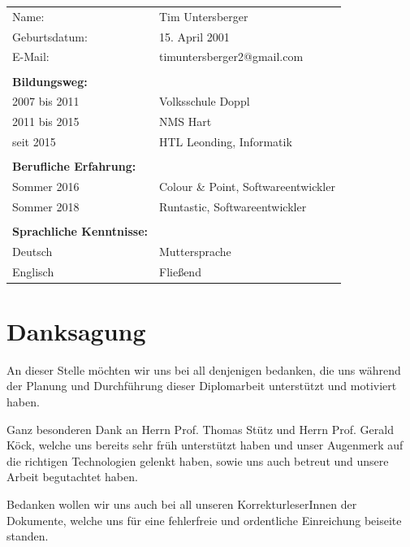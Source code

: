 \begin{table}[htb]
\begin{tabular}{ll}
Name:                            & Tim Untersberger          \\
Geburtsdatum:                    & 15. April 2001                   \\
E-Mail:                          & timuntersberger2@gmail.com          \\
                                 &                               \\
\textbf{Bildungsweg:}            &                               \\  
2007 bis 2011                    & Volksschule Doppl          \\
2011 bis 2015                    & NMS Hart     \\
seit 2015                        & HTL Leonding, Informatik      \\
                                 &                               \\
\textbf{Berufliche Erfahrung:}   &                               \\
Sommer 2016                      & {Colour \& Point}, Softwareentwickler \\
Sommer 2018                      & Runtastic, Softwareentwickler \\
                                 &                               \\
\textbf{Sprachliche Kenntnisse:} &                               \\
Deutsch                          & Muttersprache                 \\
Englisch                         & Fließend                     
\end{tabular}
\end{table}
\pagebreak
 

\section*{Danksagung}

An dieser Stelle möchten wir uns bei all denjenigen bedanken, die uns während der
Planung und Durchführung dieser Diplomarbeit unterstützt und motiviert haben.

Ganz besonderen Dank an Herrn Prof. Thomas Stütz und Herrn Prof. Gerald Köck, welche uns bereits sehr früh unterstützt haben und unser Augenmerk auf die richtigen Technologien gelenkt haben, sowie uns auch betreut und unsere Arbeit begutachtet haben.

Bedanken wollen wir uns auch bei all unseren KorrekturleserInnen der Dokumente, welche
uns für eine fehlerfreie und ordentliche Einreichung beiseite standen.